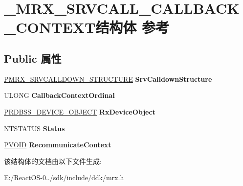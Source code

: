 \hypertarget{struct___m_r_x___s_r_v_c_a_l_l___c_a_l_l_b_a_c_k___c_o_n_t_e_x_t}{}\section{\+\_\+\+M\+R\+X\+\_\+\+S\+R\+V\+C\+A\+L\+L\+\_\+\+C\+A\+L\+L\+B\+A\+C\+K\+\_\+\+C\+O\+N\+T\+E\+X\+T结构体 参考}
\label{struct___m_r_x___s_r_v_c_a_l_l___c_a_l_l_b_a_c_k___c_o_n_t_e_x_t}
\subsection*{Public 属性}
\begin{DoxyCompactItemize}
\item 
\mbox{\label{struct___m_r_x___s_r_v_c_a_l_l___c_a_l_l_b_a_c_k___c_o_n_t_e_x_t_adb541a2a33ce3e8de3f0b425c418c36f}} 
\hyperlink{struct___m_r_x___s_r_v_c_a_l_l_d_o_w_n___s_t_r_u_c_t_u_r_e}{P\+M\+R\+X\+\_\+\+S\+R\+V\+C\+A\+L\+L\+D\+O\+W\+N\+\_\+\+S\+T\+R\+U\+C\+T\+U\+RE} {\bfseries Srv\+Calldown\+Structure}
\item 
\mbox{\label{struct___m_r_x___s_r_v_c_a_l_l___c_a_l_l_b_a_c_k___c_o_n_t_e_x_t_a2d01eff38d54b5a0cda25491a2857cba}} 
U\+L\+O\+NG {\bfseries Callback\+Context\+Ordinal}
\item 
\mbox{\label{struct___m_r_x___s_r_v_c_a_l_l___c_a_l_l_b_a_c_k___c_o_n_t_e_x_t_a80fec1fef1cb049531c9ab353962bd77}} 
\hyperlink{struct___r_d_b_s_s___d_e_v_i_c_e___o_b_j_e_c_t}{P\+R\+D\+B\+S\+S\+\_\+\+D\+E\+V\+I\+C\+E\+\_\+\+O\+B\+J\+E\+CT} {\bfseries Rx\+Device\+Object}
\item 
\mbox{\label{struct___m_r_x___s_r_v_c_a_l_l___c_a_l_l_b_a_c_k___c_o_n_t_e_x_t_a476134660e8d569d3bc033da9ab6b5b1}} 
N\+T\+S\+T\+A\+T\+US {\bfseries Status}
\item 
\mbox{\label{struct___m_r_x___s_r_v_c_a_l_l___c_a_l_l_b_a_c_k___c_o_n_t_e_x_t_a25c8ae80faea62633fbcbe028e07a29c}} 
\hyperlink{interfacevoid}{P\+V\+O\+ID} {\bfseries Recommunicate\+Context}
\end{DoxyCompactItemize}


该结构体的文档由以下文件生成\+:\begin{DoxyCompactItemize}
\item 
E\+:/\+React\+O\+S-\/0../sdk/include/ddk/mrx.\+h\end{DoxyCompactItemize}
